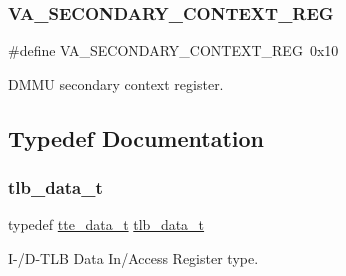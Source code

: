 \subsubsection{\texorpdfstring{VA\_SECONDARY\_CONTEXT\_REG}{VA\_SECONDARY\_CONTEXT\_REG}}
{\footnotesize\ttfamily \#define V\+A\+\_\+\+S\+E\+C\+O\+N\+D\+A\+R\+Y\+\_\+\+C\+O\+N\+T\+E\+X\+T\+\_\+\+R\+EG~0x10}

D\+M\+MU secondary context register. 

\subsection{Typedef Documentation}
\mbox{\label{group__RTEMSBSPsSPARC64mm_ga9c71ce7b9e5efa24b9e891795f8a59e1}} 
\subsubsection{\texorpdfstring{tlb\_data\_t}{tlb\_data\_t}}
{\footnotesize\ttfamily typedef \mbox{\hyperlink{uniontte__data}{tte\+\_\+data\+\_\+t}} \mbox{\hyperlink{group__RTEMSBSPsSPARC64mm_ga9c71ce7b9e5efa24b9e891795f8a59e1}{tlb\+\_\+data\+\_\+t}}}

I-\//\+D-\/\+T\+LB Data In/\+Access Register type. 